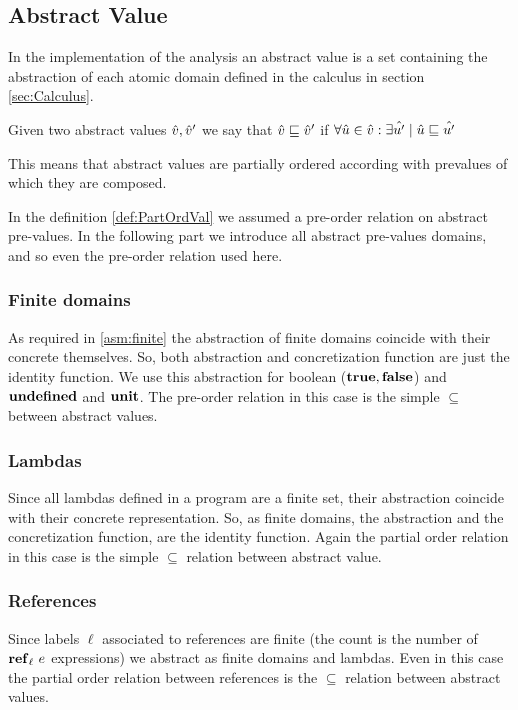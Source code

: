 \subsection{Abstract Value}
In the implementation of the analysis an abstract value is a set containing the abstraction of each atomic domain defined in the calculus in section \ref{sec:Calculus}.

\begin{definition}
\label{def:PartOrdVal}
Given two abstract values $\hat{v}, \hat{v}'$ we say that $\hat{v} \sqsubseteq \hat{v}'$ if $\forall \hat {u} \in \hat{v} :\exists \hat{u'} \mid \hat{u} \sqsubseteq \hat{u'}$
\end{definition}
This means that abstract values are partially ordered according with prevalues of which they are composed.

In the definition \ref{def:PartOrdVal} we assumed a pre-order relation on abstract pre-values. In the following part we introduce all abstract pre-values domains, and so even the pre-order relation used here.

\subsubsection{Finite domains}
As required in \ref{asm:finite} the abstraction of finite domains coincide with their concrete themselves. So, both abstraction and concretization function are just the identity function. We use this abstraction for boolean ($\mathbf{true}, \mathbf{false}$) and $\mathbf{undefined}$ and $\mathbf{unit}$. The pre-order relation in this case is the simple $\subseteq$ between abstract values.

\subsubsection{Lambdas}
Since all lambdas defined in a program are a finite set, their abstraction coincide with their concrete representation. So, as finite domains, the abstraction and the concretization function, are the identity function. Again the partial order relation in this case is the simple $\subseteq$ relation between abstract value.

\subsubsection{References}
Since labels $\ell$ associated to references are finite (the count is the number of $\mathbf{ref}_{\ell}\ e$ expressions) we abstract as finite domains and lambdas. Even in this case the partial order relation between references is the $\subseteq$ relation between abstract values.

